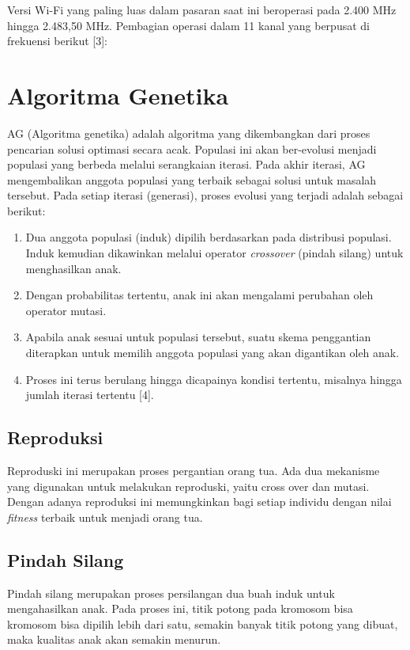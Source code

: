 \documentclass[12pt,a4paper]{report}
\begin{document}
		Versi Wi-Fi yang paling luas dalam pasaran saat ini beroperasi pada 2.400 MHz hingga 2.483,50 MHz. Pembagian operasi dalam 11 kanal yang berpusat di frekuensi berikut [3]:
		
		\section{Algoritma Genetika}
		AG (Algoritma genetika) adalah algoritma yang dikembangkan dari proses pencarian solusi optimasi secara acak. Populasi ini akan ber-evolusi menjadi populasi yang berbeda melalui serangkaian iterasi. Pada akhir iterasi, AG mengembalikan anggota populasi yang terbaik sebagai solusi untuk masalah tersebut. Pada setiap iterasi (generasi), proses evolusi yang terjadi adalah sebagai berikut:
		\begin{enumerate}
			\item Dua anggota populasi (induk) dipilih berdasarkan pada distribusi populasi. Induk kemudian dikawinkan melalui operator \emph{crossover} (pindah silang) untuk menghasilkan anak.
			
			\item Dengan probabilitas tertentu, anak ini akan mengalami perubahan oleh operator mutasi.
			
			\item Apabila anak sesuai untuk populasi tersebut, suatu skema penggantian diterapkan untuk memilih anggota populasi yang akan digantikan oleh anak.
			
			\item Proses ini terus berulang hingga dicapainya kondisi tertentu, misalnya hingga jumlah iterasi tertentu [4].
		\end{enumerate}
		
		\subsection{Reproduksi}
		Reproduski ini merupakan proses pergantian orang tua. Ada dua mekanisme yang digunakan untuk melakukan reproduski, yaitu cross over dan mutasi. Dengan adanya reproduksi ini memungkinkan bagi setiap individu dengan nilai \emph{fitness} terbaik untuk menjadi orang tua.
		\subsection{Pindah Silang}
		Pindah silang merupakan proses persilangan dua buah induk untuk mengahasilkan anak. Pada proses ini, titik potong pada kromosom bisa kromosom bisa dipilih lebih dari satu, semakin banyak titik potong yang dibuat, maka kualitas anak akan semakin menurun.
\end{document}
